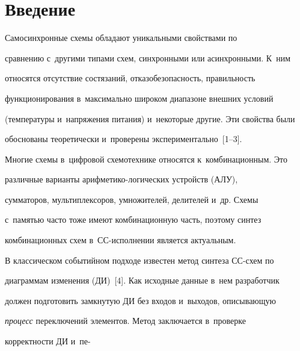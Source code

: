 \section{Введение}





\vspace*{-3pt}


       


   Самосинхронные схемы обладают уникальными свойствами по 


сравнению с~другими типами схем, синхронными или асинхронными. К~ним 


относятся отсутствие состязаний, отказобезопасность, правильность 


функционирования в~максимально широком диапазоне внешних условий 


(температуры и~напряжения питания) и~некоторые другие. Эти свойства были 


обоснованы теоретически и~проверены экспериментально~[1--3].


   


   Многие схемы в~цифровой схемотехнике относятся к~комбинационным. Это 


различные варианты ариф\-ме\-ти\-ко-ло\-ги\-че\-ских устройств (АЛУ), 


сумматоров, мультиплексоров, умножителей, делителей и~др. Схемы 


с~памятью час\-то тоже имеют комбинационную часть, поэтому синтез 


комбинационных схем в~СС-ис\-пол\-не\-нии является актуальным.


   


   В классическом событийном подходе известен метод синтеза СС-схем по 


диаграммам изменения (ДИ)~[4]. Как исходные данные в~нем разработчик 


должен подготовить замкнутую ДИ без входов и~выходов, описывающую 


\textit{процесс} переключений элементов. Метод заключается в~проверке 


корректности ДИ и~пе-\linebreak\vspace*{-12pt}





\pagebreak





